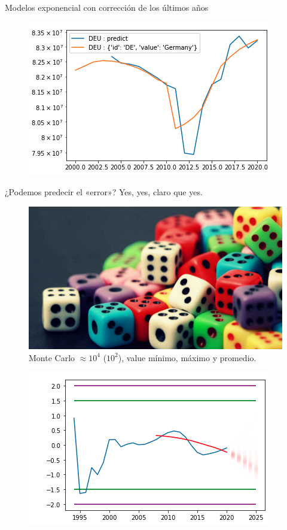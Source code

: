 \documentclass[10pt]{beamer}
\begin{document}
\begin{frame}[fragile]{Modelos exponencial con corrección de los últimos años}
\begin{figure}
\includegraphics[scale=0.28]{img/12.png}
\end{figure}
\end{frame}

\begin{frame}{¿Podemos predecir el «error»? Yes, yes, claro que yes. }
\begin{figure}
\centering
\includegraphics[scale=0.15]{img/15.jpg}
\caption{Monte Carlo $\approx 10^{4}$ ($10^{2}$), value mínimo, máximo y promedio.}
\end{figure}
\begin{figure}
\includegraphics[scale=0.3]{img/13.png}

\end{figure}
\end{frame}
\end{document}
